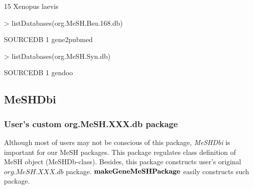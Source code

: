 \documentclass[11pt]{article}
\newcommand{\Rpackage}[1]{{\textit{#1}}}
\begin{document}
\begin{center}
\begin{Schunk}
\begin{Soutput}
15                               Xenopus laevis
\end{Soutput}
\begin{Sinput}
> listDatabases(org.MeSH.Bsu.168.db)
\end{Sinput}
\begin{Soutput}
     SOURCEDB
1 gene2pubmed
\end{Soutput}
\begin{Sinput}
> listDatabases(org.MeSH.Syn.db)
\end{Sinput}
\begin{Soutput}
  SOURCEDB
1   gendoo
\end{Soutput}
\end{Schunk}
\end{center}

\clearpage
\subsection{MeSHDbi}
\subsubsection{User's custom org.MeSH.XXX.db package}
Although most of users may not be conscious of this package, \Rpackage{MeSHDbi} is important for our MeSH packages. This package regulates class definition of MeSH object (MeSHDb-class). Besides, this package constructs user's original $org.MeSH.XXX.db$ package. $\bf{makeGeneMeSHPackage}$ easily constructs such package.
\end{document}
